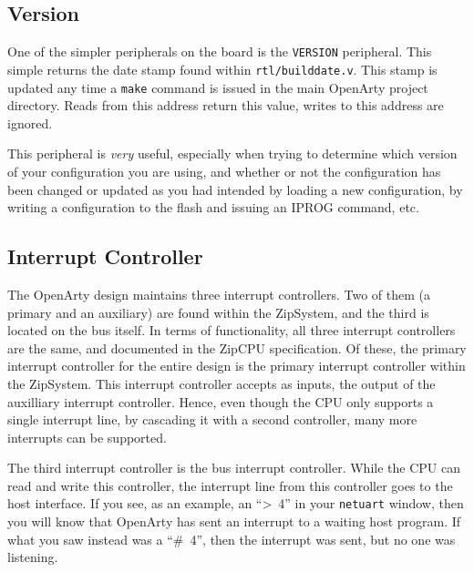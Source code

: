 \documentclass{gqtekspec}
\begin{document}
\subsection{Version}
One of the simpler peripherals on the board is the {\tt VERSION} peripheral.
This simple returns the date stamp found within {\tt rtl/builddate.v}.  This
stamp is updated any time a {\tt make} command is issued in the main OpenArty
project directory.  Reads from this address return this value, writes to this
address are ignored.

This peripheral is {\em very} useful, especially when trying to determine which
version of your configuration you are using, and whether or not the
configuration has been changed or updated as you had intended by loading a new
configuration, by writing a configuration to the flash and issuing an IPROG
command, etc.

\subsection{Interrupt Controller}
The OpenArty design maintains three interrupt controllers.  Two of them
(a primary and an auxiliary) are found within the ZipSystem, and the third is
located on the bus itself.  In terms of functionality, all three interrupt
controllers are the same, and documented in the ZipCPU specification.  Of
these, the primary interrupt controller for the
entire design is the primary interrupt controller within the ZipSystem.
This interrupt controller accepts as inputs, the output of the auxilliary
interrupt controller.
Hence, even though the CPU only supports a single interrupt line, by cascading
it with a second controller, many more interrupts can be supported.

The third interrupt controller is the bus interrupt controller.  While the
CPU can read and write this controller, the interrupt line from this controller
goes to the host interface.  If you see, as an example, an \hbox{``> 4''} in
your {\tt netuart} window, then you will know that OpenArty has sent an
interrupt to a waiting host program.  If what you saw instead was a
\hbox{``\# 4''}, then the interrupt was sent, but no one was listening.
\end{document}
